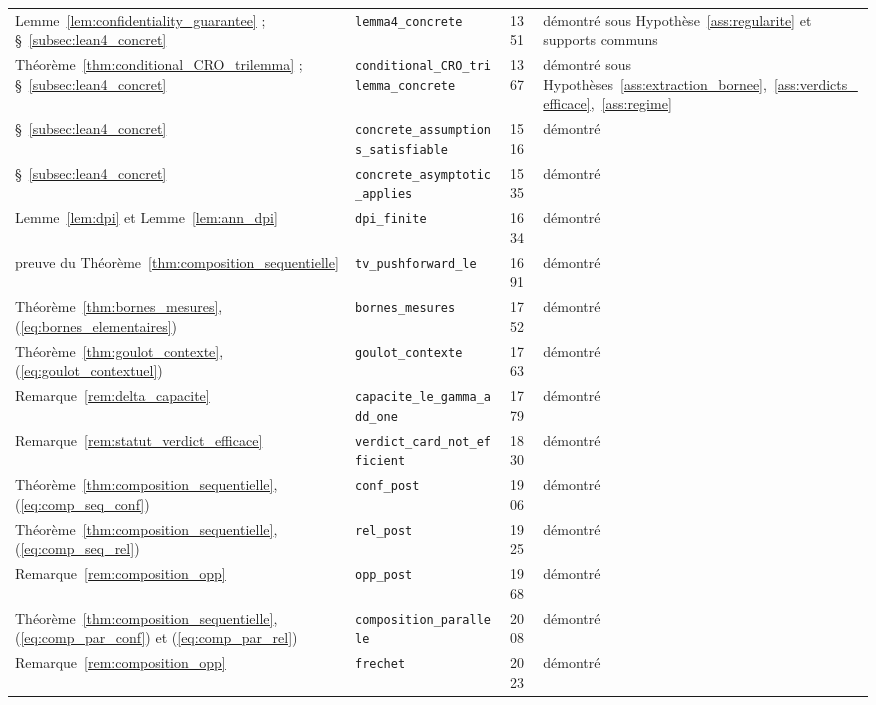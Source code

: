 {\begin{longtable}{@{}p{4.6cm}p{5.2cm}p{0.9cm}>{\raggedright\arraybackslash}p{3.6cm}@{}}
Lemme~\ref{lem:confidentiality_guarantee} ; §~\ref{subsec:lean4_concret} & \texttt{lemma4\_\allowbreak{}concrete} & 1351 & démontré sous Hypothèse~\ref{ass:regularite} et supports communs \\
Théorème~\ref{thm:conditional_CRO_trilemma} ; §~\ref{subsec:lean4_concret} & \texttt{conditional\_\allowbreak{}CRO\_\allowbreak{}trilemma\_\allowbreak{}concrete} & 1367 & démontré sous Hypothèses~\ref{ass:extraction_bornee},~\ref{ass:verdicts_efficace},~\ref{ass:regime} \\
§~\ref{subsec:lean4_concret} & \texttt{concrete\_\allowbreak{}assumptions\_\allowbreak{}satisfiable} & 1516 & démontré \\
§~\ref{subsec:lean4_concret} & \texttt{concrete\_\allowbreak{}asymptotic\_\allowbreak{}applies} & 1535 & démontré \\
Lemme~\ref{lem:dpi} et Lemme~\ref{lem:ann_dpi} & \texttt{dpi\_\allowbreak{}finite} & 1634 & démontré \\
preuve du Théorème~\ref{thm:composition_sequentielle} & \texttt{tv\_\allowbreak{}pushforward\_\allowbreak{}le} & 1691 & démontré \\
Théorème~\ref{thm:bornes_mesures}, (\ref{eq:bornes_elementaires}) & \texttt{bornes\_\allowbreak{}mesures} & 1752 & démontré \\
Théorème~\ref{thm:goulot_contexte}, (\ref{eq:goulot_contextuel}) & \texttt{goulot\_\allowbreak{}contexte} & 1763 & démontré \\
Remarque~\ref{rem:delta_capacite} & \texttt{capacite\_\allowbreak{}le\_\allowbreak{}gamma\_\allowbreak{}add\_\allowbreak{}one} & 1779 & démontré \\
Remarque~\ref{rem:statut_verdict_efficace} & \texttt{verdict\_\allowbreak{}card\_\allowbreak{}not\_\allowbreak{}efficient} & 1830 & démontré \\
Théorème~\ref{thm:composition_sequentielle}, (\ref{eq:comp_seq_conf}) & \texttt{conf\_\allowbreak{}post} & 1906 & démontré \\
Théorème~\ref{thm:composition_sequentielle}, (\ref{eq:comp_seq_rel}) & \texttt{rel\_\allowbreak{}post} & 1925 & démontré \\
Remarque~\ref{rem:composition_opp} & \texttt{opp\_\allowbreak{}post} & 1968 & démontré \\
Théorème~\ref{thm:composition_sequentielle}, (\ref{eq:comp_par_conf}) et (\ref{eq:comp_par_rel}) & \texttt{composition\_\allowbreak{}parallele} & 2008 & démontré \\
Remarque~\ref{rem:composition_opp} & \texttt{frechet} & 2023 & démontré \\

\end{longtable}}

